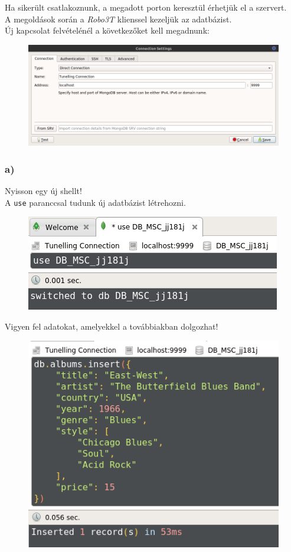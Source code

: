 \documentclass[a4paper, 12pt]{article}
\begin{document}
\noindent Ha sikerült csatlakoznunk, a megadott porton keresztül érhetjük el a szervert.\\
A megoldások során a \textit{Robo3T} klienssel kezeljük az adatbázist.\\
Új kapcsolat felvételénél a következőket kell megadnunk:
\begin{figure}[!hb]
	\centering
	\includegraphics[scale = 0.5]{images/0_Robo_connect.png}
	\label{fig:0_Robo_connect}
\end{figure}	

\subsubsection*{a)}
Nyisson egy új shellt!\\
A \texttt{use} paranccsal tudunk új adatbázist létrehozni.
\begin{figure}[!hb]
	\centering
	\includegraphics[scale = 0.7]{images/0_useDB.png}
	\label{fig:0_useDB}
\end{figure}

\noindent Vigyen fel adatokat, amelyekkel a továbbiakban dolgozhat!
\clearpage
\begin{figure}[!hb]
	\centering
	\includegraphics[scale = 0.45]{images/1_a1.png}
	\label{fig:1_a1}
\end{figure}	
\end{document}
